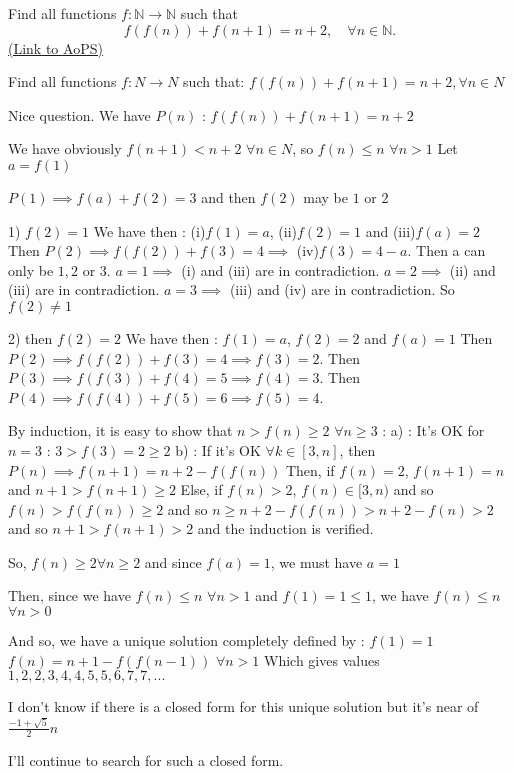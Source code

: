 \begin{problem}
	Find all functions $f: \mathbb N\to \mathbb N$ such that
\[f(f(n))+f(n+1)=n+2, \quad \forall n\in \mathbb N.\]
	\flushright \href{https://artofproblemsolving.com/community/c6h153079}{(Link to AoPS)}
\end{problem}



\begin{mysolution}
	\begin{tcolorbox}Find all functions $f: N\to N$ such that: 
$f(f(n))+f(n+1)=n+2, \forall n\in N$\end{tcolorbox}

Nice question.
We have $P(n)$ : $f(f(n))+f(n+1)=n+2$

We have obviously $f(n+1)<n+2$ $\forall n\in N$, so $f(n)\leq n$ $\forall n>1$
Let $a=f(1)$

$P(1) \implies f(a)+f(2)=3$ and then $f(2)$ may be $1$ or $2$

1) $f(2)=1$
We have then : (i)$f(1)=a$, (ii)$f(2)=1$ and (iii)$f(a)=2$
Then $P(2)\implies f(f(2))+f(3)=4 \implies$ (iv)$f(3)=4-a$. Then a can only be $1,2$ or $3$.
$a=1 \implies$ (i) and (iii) are in contradiction.
$a=2 \implies$ (ii) and (iii) are in contradiction.
$a=3 \implies$ (iii) and (iv) are in contradiction.
So $f(2)\neq 1$

2) then $f(2)=2$
We have then : $f(1)=a$, $f(2)=2$ and $f(a)=1$
Then $P(2)\implies f(f(2))+f(3)=4 \implies f(3)=2$.
Then $P(3)\implies f(f(3))+f(4)=5 \implies f(4)=3$.
Then $P(4)\implies f(f(4))+f(5)=6 \implies f(5)=4$.

By induction, it is easy to show that $n>f(n)\geq 2$ $\forall n\geq 3$ :
a) : It's OK for $n=3$ : $3>f(3)=2\geq 2$
b) : If it's OK $\forall k\in [3,n]$, then $P(n) \implies f(n+1)=n+2-f(f(n))$
Then, if $f(n)=2$, $f(n+1)=n$ and $n+1>f(n+1)\geq 2$ 
Else, if $f(n)>2$, $f(n)\in[3,n)$ and so $f(n)>f(f(n))\geq 2$ and so $n\geq n+2-f(f(n))> n+2-f(n)>2$ and so $n+1> f(n+1)>2$
and the induction is verified.

So, $f(n)\geq 2 \forall n\geq 2$ and since $f(a)=1$, we must have $a=1$

Then, since we have $f(n)\leq n$ $\forall n>1$ and $f(1)=1\leq 1$, we have $f(n)\leq n$ $\forall n>0$

And so, we have a unique solution completely defined by :
$f(1)=1$
$f(n)=n+1-f(f(n-1))$ $\forall n>1$
Which gives values $1,2,2,3,4,4,5,5,6,7,7,...$

I don't know if there is a closed form for this unique solution but it's near of $\frac{-1+\sqrt{5}}{2}n$

I'll continue to search for such a closed form.
\end{mysolution}



